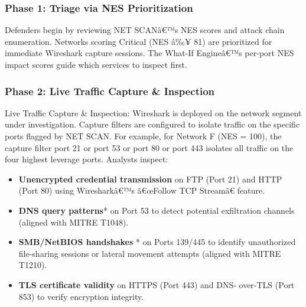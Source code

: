 \documentclass[conference]{IEEEtran}
\begin{document}
\subsubsection{Phase 1: Triage via NES Prioritization}
Defenders begin
by reviewing NET SCANâ€™s NES scores and attack chain enumeration. Networks scoring Critical (NES â‰¥ 81) are prioritized for immediate Wireshark capture sessions. The What-If
Engineâ€™s per-port NES impact scores guide which services to
inspect first.

\subsubsection{Phase 2: Live Traffic Capture \& Inspection}
 Live Traffic Capture & Inspection: Wireshark
is deployed on the network segment under investigation. Capture filters are configured to isolate traffic on the specific ports flagged by NET SCAN. For example, for Network F (NES = 100), the capture filter port 21 or port 53 or port
80 or port 443 isolates all traffic on the four highest leverage ports. 
Analysts inspect:
\begin{itemize}
    \item \textbf{Unencrypted credential transmission} on FTP (Port 21)
and HTTP (Port 80) using Wiresharkâ€™s â€œFollow TCP
Streamâ€ feature.
    \item \textbf{DNS query patterns}* on Port 53 to detect potential exfiltration channels (aligned with MITRE T1048).
    \item \textbf{SMB/NetBIOS handshakes} * on Ports 139/445 to identify
unauthorized file-sharing sessions or lateral movement attempts (aligned with MITRE T1210).
    \item \textbf{TLS certificate validity} on HTTPS (Port 443) and DNS-
over-TLS (Port 853) to verify encryption integrity.
\end{itemize}
\end{document}
